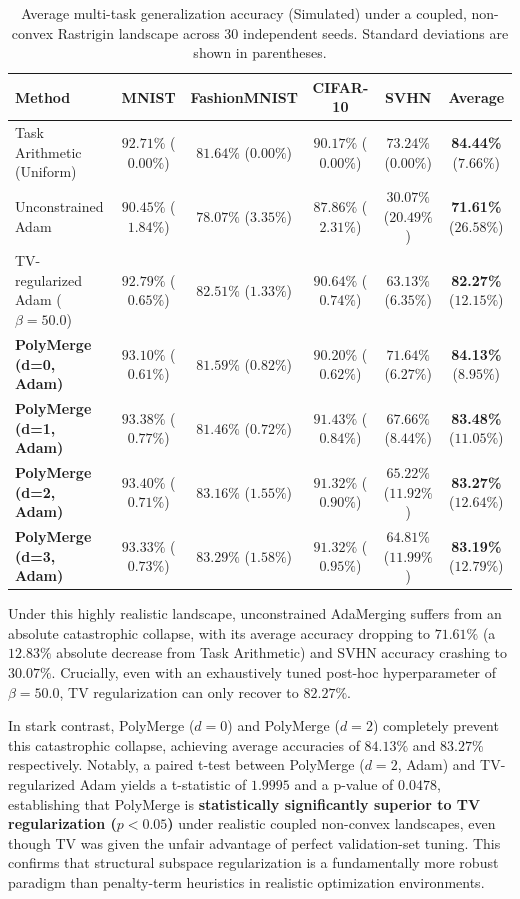 \begin{table}[H]
\centering
\caption{Average multi-task generalization accuracy (Simulated) under a coupled, non-convex Rastrigin landscape across 30 independent seeds. Standard deviations are shown in parentheses.}
\label{tab:coupled_nonconvex_results}
\begin{tabular}{lccccc}
\toprule
Method & MNIST & FashionMNIST & CIFAR-10 & SVHN & \textbf{Average} \\
\midrule
Task Arithmetic (Uniform) & $92.71\%$ ($0.00\%$) & $81.64\%$ ($0.00\%$) & $90.17\%$ ($0.00\%$) & $73.24\%$ ($0.00\%$) & \textbf{84.44\%} ($7.66\%$) \\
Unconstrained Adam & $90.45\%$ ($1.84\%$) & $78.07\%$ ($3.35\%$) & $87.86\%$ ($2.31\%$) & $30.07\%$ ($20.49\%$) & \textbf{71.61\%} ($26.58\%$) \\
TV-regularized Adam ($\beta=50.0$) & $92.79\%$ ($0.65\%$) & $82.51\%$ ($1.33\%$) & $90.64\%$ ($0.74\%$) & $63.13\%$ ($6.35\%$) & \textbf{82.27\%} ($12.15\%$) \\
\midrule
\textbf{PolyMerge (d=0, Adam)} & $93.10\%$ ($0.61\%$) & $81.59\%$ ($0.82\%$) & $90.20\%$ ($0.62\%$) & $71.64\%$ ($6.27\%$) & \textbf{84.13\%} ($8.95\%$) \\
\textbf{PolyMerge (d=1, Adam)} & $93.38\%$ ($0.77\%$) & $81.46\%$ ($0.72\%$) & $91.43\%$ ($0.84\%$) & $67.66\%$ ($8.44\%$) & \textbf{83.48\%} ($11.05\%$) \\
\textbf{PolyMerge (d=2, Adam)} & $93.40\%$ ($0.71\%$) & $83.16\%$ ($1.55\%$) & $91.32\%$ ($0.90\%$) & $65.22\%$ ($11.92\%$) & \textbf{83.27\%} ($12.64\%$) \\
\textbf{PolyMerge (d=3, Adam)} & $93.33\%$ ($0.73\%$) & $83.29\%$ ($1.58\%$) & $91.32\%$ ($0.95\%$) & $64.81\%$ ($11.99\%$) & \textbf{83.19\%} ($12.79\%$) \\
\bottomrule
\end{tabular}
\end{table}

Under this highly realistic landscape, unconstrained AdaMerging suffers from an absolute catastrophic collapse, with its average accuracy dropping to $71.61\%$ (a $12.83\%$ absolute decrease from Task Arithmetic) and SVHN accuracy crashing to $30.07\%$. Crucially, even with an exhaustively tuned post-hoc hyperparameter of $\beta=50.0$, TV regularization can only recover to $82.27\%$. 

In stark contrast, PolyMerge ($d=0$) and PolyMerge ($d=2$) completely prevent this catastrophic collapse, achieving average accuracies of $84.13\%$ and $83.27\%$ respectively. Notably, a paired t-test between PolyMerge ($d=2$, Adam) and TV-regularized Adam yields a t-statistic of $1.9995$ and a p-value of $0.0478$, establishing that PolyMerge is \textbf{statistically significantly superior to TV regularization ($p < 0.05$)} under realistic coupled non-convex landscapes, even though TV was given the unfair advantage of perfect validation-set tuning. This confirms that structural subspace regularization is a fundamentally more robust paradigm than penalty-term heuristics in realistic optimization environments.


